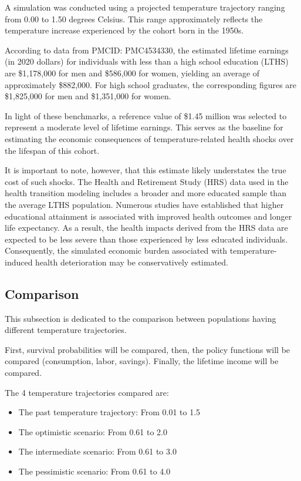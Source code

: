 \documentclass{article}
\begin{document}
A simulation was conducted using a projected temperature trajectory ranging from 0.00 to 1.50 degrees Celsius. This range approximately reflects the temperature increase experienced by the cohort born in the 1950s.

According to data from PMCID: PMC4534330, the estimated lifetime earnings (in 2020 dollars) for individuals with less than a high school education (LTHS) are \$1,178,000 for men and \$586,000 for women, yielding an average of approximately \$882,000.
For high school graduates, the corresponding figures are \$1,825,000 for men and \$1,351,000 for women.

In light of these benchmarks, a reference value of \$1.45 million was selected to represent a moderate level of lifetime earnings. This serves as the baseline for estimating the economic consequences of temperature-related health shocks over the lifespan of this cohort.

It is important to note, however, that this estimate likely understates the true cost of such shocks. The Health and Retirement Study (HRS) data used in the health transition modeling includes a broader and more educated sample than the average LTHS population. Numerous studies have established that higher educational attainment is associated with improved health outcomes and longer life expectancy. As a result, the health impacts derived from the HRS data are expected to be less severe than those experienced by less educated individuals. Consequently, the simulated economic burden associated with temperature-induced health deterioration may be conservatively estimated.
\subsection{Comparison}

This subsection is dedicated to the comparison between 
populations having different temperature trajectories. 

First, survival probabilities will be compared, 
then, the policy functions will be compared (consumption, labor, savings). 
Finally, the lifetime income will be compared.

The 4 temperature trajectories compared are: 

\begin{itemize}
    \item The past temperature trajectory: From 0.01 to 1.5
    \item The optimistic scenario: From 0.61 to 2.0
    \item The intermediate scenario: From 0.61 to 3.0 
    \item The pessimistic scenario: From 0.61 to 4.0 
\end{itemize}
\end{document}
